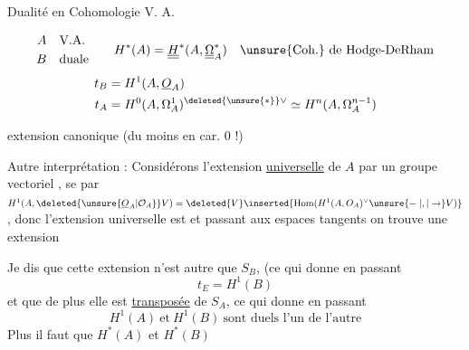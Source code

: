 Dualité en Cohomologie  V. A.

\[
\begin{aligned}
 A&\quad\text{V.A.}\\
 B&\quad\text{duale}
\end{aligned}
\qquad
 H^*(A)=\underline{\underline{H}}^*(A,\underline{\underline{\Omega}}_A^*)
 \quad\text{\unsure{Coh.} de Hodge-DeRham}
\]
\[
\begin{aligned}
 t_B&=H^1(A,\underline{O}_A)\\
 t_A&=H^0(A,\Omega_A^1)^{\deleted{\unsure{*}}\vee}\simeq H^n(A,\Omega_A^{n-1})
\end{aligned}
\]

extension canonique (du moins en car. 0 !)

Autre interprétation : Considérons l'extension \uline{universelle} de $A$ par un groupe vectoriel ,   se   par $H^1(A,\deleted{\unsure{\underline{O}_A|\mathcal{O}_A}}V)=\deleted{V}\inserted{\operatorname{Hom}(H^1(A,O_A)^\vee\unsure{\relbar|,|\to}V)}$, donc l'extension universelle est
et passant aux espaces tangents on trouve une extension

Je dis que cette extension n'est autre que $S_B$, (ce qui donne en passant
\[
 t_E=H^1(B) \tag*{)}
\]
et que de plus elle est \uline{transposée} de $S_A$, ce qui donne en passant
\[
 \boxed{H^1(A)\ \text{et}\ H^1(B)\ \text{sont duels l'un de l'autre}}
\]
\margin{$\Vert$}Plus  il faut  que $H^*(A)$ et $H^*(B)$

